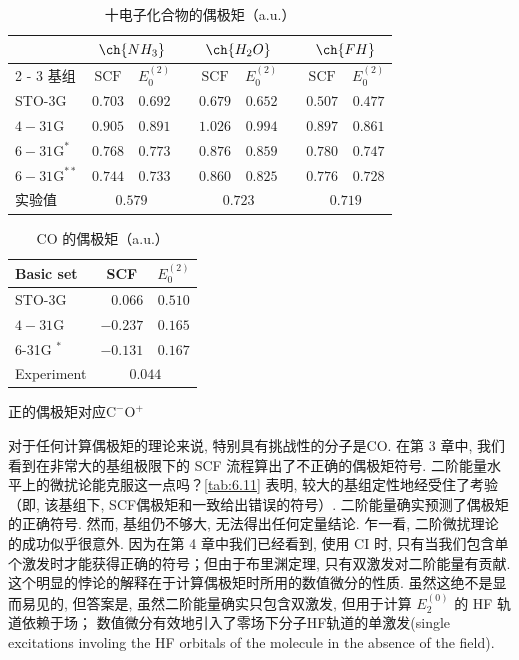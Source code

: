 \begin{table}
	\centering
	\caption{十电子化合物的偶极矩（a.u.）}
	\begin{tabular}{lcccccccc}
		\hline & \multicolumn{2}{c}{$\ch{NH_3}$} & & \multicolumn{2}{c}{$\ch{H_2O}$} & & \multicolumn{2}{c}{$\ch{FH}$} \\
		\cline { 2 - 3 } \cline { 5 - 6 } \cline { 8 - 9 } 基组 & $\mathrm{SCF}$ & $E_0^{(2)}$ & & $\mathrm{SCF}$ & $E_0^{(2)}$ & & $\mathrm{SCF}$ & $E_0^{(2)}$ \\
		\hline STO-3G & $0.703$ & $0.692$ & & $0.679$ & $0.652$ & & $0.507$ & $0.477$ \\
		$4-31 \mathrm{G}$ & $0.905$ & $0.891$ & & $1.026$ & $0.994$ & & $0.897$ & $0.861$ \\
		$6-31 \mathrm{G}^*$ & $0.768$ & $0.773$ & & $0.876$ & $0.859$ & & $0.780$ & $0.747$ \\
		$6-31 \mathrm{G}^{* *}$ & $0.744$ & $0.733$ & & $0.860$ & $0.825$ & & $0.776$ & $0.728$ \\
		实验值 & \multicolumn{2}{c}{$0.579$} & & \multicolumn{2}{c}{$0.723$} & & \multicolumn{2}{c}{$0.719$} \\
		\hline
	\end{tabular}
	\label{tab:6.10}
\end{table}

\begin{table}
	\centering
	\caption{CO 的偶极矩（a.u.）}
	\begin{threeparttable}
		\begin{tabular}{lrc}
			\hline Basic set & \multicolumn{1}{c}{ SCF } & $E_0^{(2)}$ \\
			\hline STO-3G & $0.066$ & $0.510$ \\
			$4-31 \mathrm{G}$ & $-0.237$ & $0.165$ \\
			6-31G $^*$ & $-0.131$ & $0.167$ \\
			Experiment & \multicolumn{2}{c}{$0.044$} \\
			\hline
		\end{tabular}
		\begin{tablenotes}
			\item[a] 正的偶极矩对应$\mathrm{C^-O^+}$
		\end{tablenotes}
	\end{threeparttable}
	\label{tab:6.11}
\end{table}

对于任何计算偶极矩的理论来说, 特别具有挑战性的分子是CO. 
在第 3 章中, 我们看到在非常大的基组极限下的 SCF 流程算出了不正确的偶极矩符号. 
二阶能量水平上的微扰论能克服这一点吗？\autoref{tab:6.11} 表明, 
较大的基组定性地经受住了考验（即, 该基组下, SCF偶极矩和一致给出错误的符号）. 
二阶能量确实预测了偶极矩的正确符号. 然而, 基组仍不够大, 无法得出任何定量结论. 
乍一看, 二阶微扰理论的成功似乎很意外. 因为在第 4 章中我们已经看到, 使用 CI 时, 只有当我们包含单个激发时才能获得正确的符号；但由于布里渊定理, 只有双激发对二阶能量有贡献. 
这个明显的悖论的解释在于计算偶极矩时所用的数值微分的性质. 
虽然这绝不是显而易见的, 但答案是, 虽然二阶能量确实只包含双激发, 但用于计算 $E_2^{(0)}$ 的 HF 轨道依赖于场；
数值微分有效地引入了零场下分子HF轨道的单激发(single excitations involing the HF orbitals of the molecule in the absence of the field). 

